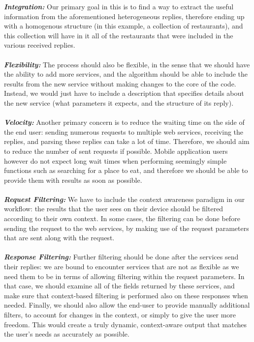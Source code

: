 \textbf{\textit{Integration:}} Our primary goal in this is to find a way to extract the useful information from the aforementioned heterogeneous replies, therefore ending up with a homogenous structure (in this example, a collection of restaurants), and this collection will have in it all of the restaurants that were included in the various received replies.\\\\
\textbf{\textit{Flexibility:}} The process should also be flexible, in the sense that we should have the ability to add more services, and the algorithm should be able to include the results from the new service without making changes to the core of the code. Instead, we would just have to include a description that specifies details about the new service (what parameters it expects, and the structure of its reply).\\\\
\textbf{\textit{Velocity:}} Another primary concern is to reduce the waiting time on the side of the end user: sending numerous requests to multiple web services, receiving the replies, and parsing these replies can take a lot of time. Therefore, we should aim to reduce the number of sent requests if possible. Mobile application users however do not expect long wait times when performing seemingly simple functions such as searching for a place to eat, and therefore we should be able to provide them with results as soon as possible.\\\\
\textbf{\textit{Request Filtering:}} We have to include the context awareness paradigm in our workflow: the results that the user sees on their device should be filtered according to their own context. In some cases, the filtering can be done before sending the request to the web services, by making use of the request parameters that are sent along with the request.\\\\
\textbf{\textit{Response Filtering:}} Further filtering should be done after the services send their replies: we are bound to encounter services that are not as flexible as we need them to be in terms of allowing filtering within the request parameters. In that case, we should examine all of the fields returned by these services, and make sure that context-based filtering is performed also on these responses when needed. Finally, we should also allow the end-user to provide manually additional filters, to account for changes in the context, or simply to give the user more freedom. This would create a truly dynamic, context-aware output that matches the user's needs as accurately as possible.\\\\
